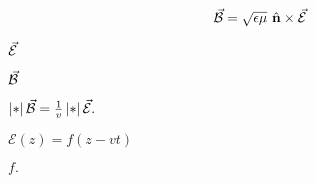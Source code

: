 \documentclass[10pt]{book}
\begin{document}
\begin{mdSnippets}
\begin{mdDisplaySnippet}%
\[%
\vBB = \sqrt{\epsilon\mu}\ \vn \times \vEE
\]%
\end{mdDisplaySnippet}%
\begin{mdInlineSnippet}%
$\vec{\mathcal{E}}$\end{mdInlineSnippet}%
\begin{mdInlineSnippet}[9753da3b8740fe5fb11142e0a6613de8]%
$\vec{\mathcal{B}}$\end{mdInlineSnippet}%
\begin{mdInlineSnippet}[b9ecba80b09dd2783868e27d65c93a93]%
$\left\vert *\right\vert{\vec{\mathcal{B}}} = \frac{1}{v} \left\vert *\right\vert{\vec{\mathcal{E}}}.$\end{mdInlineSnippet}%
\begin{mdInlineSnippet}[b31d5dc945d47925f07107d15157d14f]%
$\mathcal{E}(z) = f(z - vt)$\end{mdInlineSnippet}%
\begin{mdInlineSnippet}[e3cde3f61de01c172fa395c723c68d2f]%
$f.$\end{mdInlineSnippet}%

\end{mdSnippets}
\end{document}

